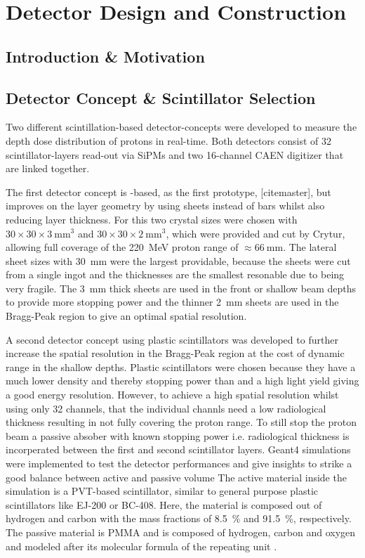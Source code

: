 \chapter{Detector Design and Construction}\label{chapter:setup}

\section{Introduction \& Motivation}

\section{Detector Concept \& Scintillator Selection}\label{section:detector:concept}
Two different scintillation-based detector-concepts were developed to measure the depth dose distribution of protons in real-time.
Both detectors consist of 32 scintillator-layers read-out via \glspl{SiPM} and two 16-channel CAEN digitizer that are linked together.

The first detector concept is -based, as the first prototype,  [citemaster], but improves on the layer geometry by using sheets instead of bars whilst also reducing layer thickness.
For this two crystal sizes were chosen with $30\times30\times3~\text{mm}^3$ and $30\times30\times2~\text{mm}^3$, which were provided and cut by Crytur, allowing full coverage of the \SI{220}{\mega\electronvolt} proton range of $\approx \SI{66}{\mm}$.
The lateral sheet sizes with \SI{30}{\mm} were the largest providable, because the sheets were cut from a single ingot and the thicknesses are the smallest resonable due to  being very fragile.
The \SI{3}{\mm} thick sheets are used in the front or shallow beam depths to provide more stopping power and the thinner \SI{2}{\mm} sheets are used in the Bragg-Peak region to give an optimal spatial resolution.

A second detector concept using plastic scintillators was developed to further increase the spatial resolution in the Bragg-Peak region at the cost of dynamic range in the shallow depths. 
Plastic scintillators were chosen because they have a much lower density and thereby stopping power than  and a high light yield giving a good energy resolution.
However, to achieve a high spatial resolution whilst using only 32 channels, that the individual channls need a low radiological thickness resulting in not fully covering the proton range.
To still stop the proton beam a passive absober with known stopping power i.e. radiological thickness is incorperated between the first and second scintillator layers.
Geant4 simulations were implemented to test the detector performances and give insights to strike a good balance between active and passive volume
The active material inside the simulation is a PVT-based scintillator, similar to general purpose plastic scintillators like EJ-200 or BC-408.
Here, the material is composed out of hydrogen and carbon with the mass fractions of \SI{8.5}{\percent} and \SI{91.5}{\percent}, respectively.
The passive material is PMMA and is composed of hydrogen, carbon and oxygen and modeled after its molecular formula of the repeating unit  . 

